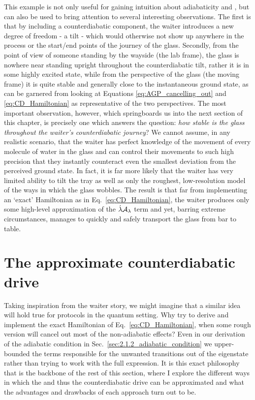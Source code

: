     This example is not only useful for gaining intuition about adiabaticity and , but can also be used to bring attention to several interesting observations. The first is that by including a counterdiabatic component, the waiter introduces a new degree of freedom - a tilt - which would otherwise not show up anywhere in the process or the start/end points of the journey of the glass. Secondly, from the point of view of someone standing by the wayside (the lab frame), the glass is nowhere near standing upright throughout the counterdiabatic tilt, rather it is in some highly excited state, while from the perspective of the glass (the moving frame) it is quite stable and generally close to the instantaneous ground state, as can be garnered from looking at Equations \eqref{eq:AGP_cancelling_out} and \eqref{eq:CD_Hamiltonian} as representative of the two perspectives. The most important observation, however, which springboards us into the next section of this chapter, is precisely one which answers the question: \emph{how stable is the glass throughout the waiter's counterdiabatic journey}? We cannot assume, in any realistic scenario, that the waiter has perfect knowledge of the movement of every molecule of water in the glass and can control their movements to such high precision that they instantly counteract even the smallest deviation from the perceived ground state. In fact, it is far more likely that the waiter has very limited ability to tilt the tray as well as only the roughest, low-resolution model of the ways in which the glass wobbles. The result is that far from implementing an `exact'  Hamiltonian as in Eq.~\eqref{eq:CD_Hamiltonian}, the waiter produces only some high-level approximation of the $\dot{\lambda} \mathcal{A}_{\lambda}$ term and yet, barring extreme circumstances, manages to quickly and safely transport the glass from bar to table.

    \section{The approximate counterdiabatic drive}\label{sec:2.4_approximate_CD}

    Taking inspiration from the waiter story, we might imagine that a similar idea will hold true for  protocols in the quantum setting. Why try to derive and implement the exact Hamiltonian of Eq.~\eqref{eq:CD_Hamiltonian}, when some rough version will cancel out most of the non-adiabatic effects? Even in our derivation of the adiabatic condition in Sec.~\ref{sec:2.1.2_adiabatic_condition} we upper-bounded the terms responsible for the unwanted transitions out of the eigenstate rather than trying to work with the full expression. It is this exact philosophy that is the backbone of the rest of this section, where I explore the different ways in which the  and thus the counterdiabatic drive can be approximated and what the advantages and drawbacks of each approach turn out to be.

